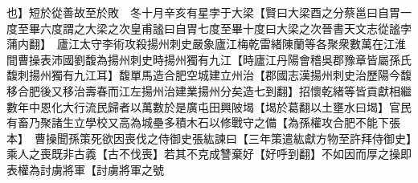 也】短於從善故至於敗　冬十月辛亥有星孛于大梁【賢曰大梁酉之分蔡邕曰自胃一度至畢六度謂之大梁之次皇甫謐曰自胃七度至畢十度曰大梁之次晉書天文志從謐孛蒲内翻】　廬江太守李術攻殺揚州刺史嚴象廬江梅乾雷緒陳蘭等各聚衆數萬在江淮間曹操表沛國劉馥為揚州刺史時揚州獨有九江【時廬江丹陽會稽吳郡豫章皆屬孫氏馥刺揚州獨有九江耳】馥單馬造合肥空城建立州治【郡國志漢揚州刺史治歷陽今馥移合肥後又移治壽春而江左揚州治建業揚州分矣造七到翻】招懷乾緒等皆貢獻相繼數年中恩化大行流民歸者以萬數於是廣屯田興陂堨【堨於葛翻以土壅水曰堨】官民有畜乃聚諸生立學校又高為城壘多積木石以修戰守之備【為孫權攻合肥不能下張本】　曹操聞孫策死欲因喪伐之侍御史張紘諫曰【三年策遣紘獻方物至許拜侍御史】乘人之喪既非古義【古不伐喪】若其不克成讐棄好【好呼到翻】不如因而厚之操即表權為討虜將軍【討虜將軍之號